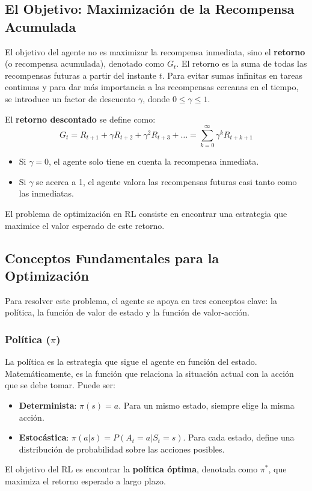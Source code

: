 \documentclass[12pt,a4paper]{book}
\begin{document}
\subsection{El Objetivo: Maximización de la Recompensa Acumulada}

El objetivo del agente no es maximizar la recompensa inmediata, sino el \textbf{retorno} (o recompensa acumulada), denotado como $G_t$. El retorno es la suma de todas las recompensas futuras a partir del instante $t$. Para evitar sumas infinitas en tareas continuas y para dar más importancia a las recompensas cercanas en el tiempo, se introduce un factor de descuento $\gamma$, donde $0 \le \gamma \le 1$.

El \textbf{retorno descontado} se define como:
\[ G_t = R_{t+1} + \gamma R_{t+2} + \gamma^2 R_{t+3} + \dots = \sum_{k=0}^{\infty} \gamma^k R_{t+k+1} \]

\begin{itemize}
    \item Si $\gamma = 0$, el agente solo tiene en cuenta la recompensa inmediata.
    \item Si $\gamma$ se acerca a 1, el agente valora las recompensas futuras casi tanto como las inmediatas.
\end{itemize}

El problema de optimización en RL consiste en encontrar una estrategia que maximice el valor esperado de este retorno.

\subsection{Conceptos Fundamentales para la Optimización}

Para resolver este problema, el agente se apoya en tres conceptos clave: la política, la función de valor de estado y la función de valor-acción.

\subsubsection{Política ($\pi$)}
La política es la estrategia que sigue el agente en función del estado. Matemáticamente, es la función que relaciona la situación actual con la acción que se debe tomar. Puede ser:
\begin{itemize}
    \item \textbf{Determinista}: $\pi(s) = a$. Para un mismo estado, siempre elige la misma acción.
    \item \textbf{Estocástica}: $\pi(a|s) = P(A_t = a | S_t = s)$. Para cada estado, define una distribución de probabilidad sobre las acciones posibles.
\end{itemize}
El objetivo del RL es encontrar la \textbf{política óptima}, denotada como $\pi^*$, que maximiza el retorno esperado a largo plazo.
\end{document}
